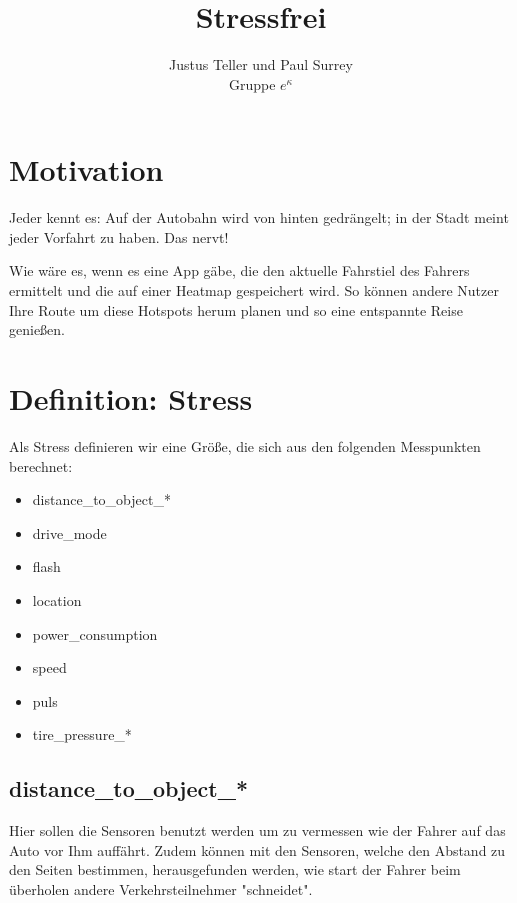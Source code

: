 \documentclass[twocolumn,a4paper,10pt]{IEEEtran}
\begin{document}
\onecolumn
\begin{titlepage}
	\centering
	\title{Stressfrei}
	\author{Justus Teller und Paul Surrey \\
	Gruppe $e^\kappa$}
	\maketitle
	\tableofcontents
\end{titlepage}
	\newpage
	\twocolumn

\section{Motivation}
	Jeder kennt es: Auf der Autobahn wird von hinten gedrängelt; in der Stadt meint jeder Vorfahrt zu haben. Das nervt!
	
	Wie wäre es, wenn es eine App gäbe, die den aktuelle Fahrstiel des Fahrers ermittelt und die auf einer Heatmap gespeichert wird. So können andere Nutzer Ihre Route um diese Hotspots herum planen und so eine entspannte Reise genießen.

\section{Definition: Stress}
	Als Stress definieren wir eine Größe, die sich aus den folgenden Messpunkten berechnet:
	
	\begin{itemize}
		\item distance_to_object_*
		\item drive_mode
		\item flash
		\item location
		\item power_consumption
		\item speed
		\item puls
		\item tire_pressure_*
	\end{itemize}

	\subsection{distance_to_object_*}
		Hier sollen die Sensoren benutzt werden um zu vermessen wie der Fahrer auf das Auto vor Ihm auffährt. Zudem können mit den Sensoren, welche den Abstand zu den Seiten bestimmen, herausgefunden werden, wie start der Fahrer beim überholen andere Verkehrsteilnehmer "schneidet".
\end{document}

